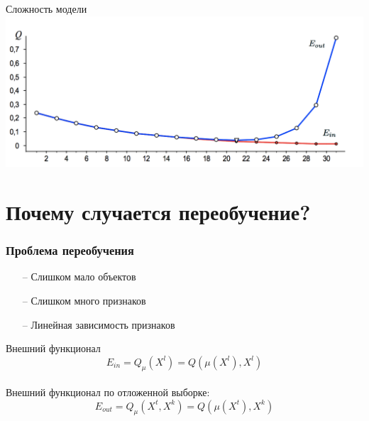 \documentclass[10pt]{beamer}
\begin{document}
\begin{frame}{Сложность модели}  
  \centering
  \includegraphics[width=\textwidth]{images/learning_curve}
\end{frame}

\section{Почему случается переобучение?}


\begin{frame}\frametitle{Проблема переобучения}
	\begin{itemize}
		\item[--] Слишком мало объектов
		\item[--] Слишком много признаков
		\item[--] Линейная зависимость признаков
	\end{itemize}
\end{frame}

\begin{frame}{Внешний функционал}  
  $$E_{in} = Q_{\mu}(X^l) = Q(\mu(X^l), X^l)$$\\
  \bigbreak
  Внешний функционал по отложенной выборке:\\
  $$E_{out} = Q_{\mu}(X^t, X^k) = Q(\mu(X^t), X^k)$$\\
  \bigbreak
\end{frame}
\end{document}
